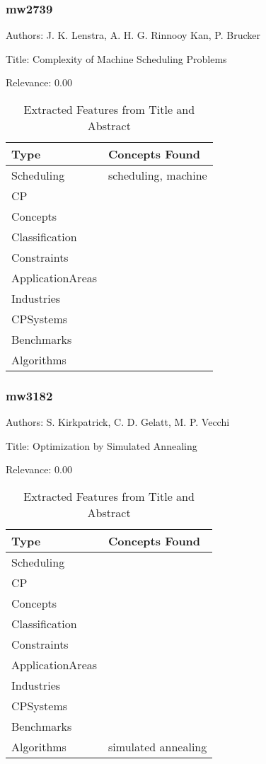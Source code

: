 \subsubsection{mw2739}
\label{mw:mw2739}

Authors: J. K. Lenstra, A. H. G. Rinnooy Kan, P. Brucker

Title: Complexity of Machine Scheduling Problems

Relevance:  0.00

{\scriptsize
\begin{longtable}{p{2cm}p{20cm}}
\caption{Extracted Features from Title and Abstract}\\ \toprule
Type & Concepts Found\\ \midrule
\endhead
\bottomrule
\endfoot
Scheduling & scheduling, machine\\ 
CP & \\ 
Concepts & \\ 
Classification & \\ 
Constraints & \\ 
ApplicationAreas & \\ 
Industries & \\ 
CPSystems & \\ 
Benchmarks & \\ 
Algorithms & \\ 
\end{longtable}
}



\subsubsection{mw3182}
\label{mw:mw3182}

Authors: S. Kirkpatrick, C. D. Gelatt, M. P. Vecchi

Title: Optimization by Simulated Annealing

Relevance:  0.00

{\scriptsize
\begin{longtable}{p{2cm}p{20cm}}
\caption{Extracted Features from Title and Abstract}\\ \toprule
Type & Concepts Found\\ \midrule
\endhead
\bottomrule
\endfoot
Scheduling & \\ 
CP & \\ 
Concepts & \\ 
Classification & \\ 
Constraints & \\ 
ApplicationAreas & \\ 
Industries & \\ 
CPSystems & \\ 
Benchmarks & \\ 
Algorithms & simulated annealing\\ 
\end{longtable}
}

